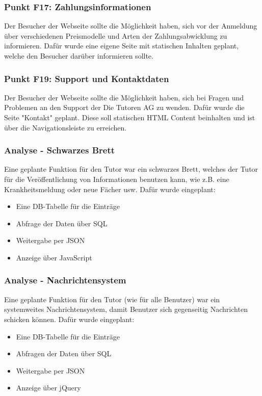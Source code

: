 \begin{frame}
  	\frametitle{Punkt F17: Zahlungsinformationen}
  
  	Der Besucher der Webseite sollte die Möglichkeit haben, sich vor der Anmeldung über verschiedenen Preismodelle und Arten der Zahlungsabwicklung zu informieren.
  	\bigskip\newline Dafür wurde eine eigene Seite mit statischen Inhalten geplant, welche den Besucher darüber informieren sollte.
\end{frame}

\begin{frame}
  	\frametitle{Punkt F19: Support und Kontaktdaten}
  
  	Der Besucher der Webseite sollte die Möglichkeit haben, sich bei Fragen und Problemen an den Support der Die Tutoren AG zu wenden.
  	\bigskip\newline Dafür wurde die Seite "Kontakt" geplant. Diese soll statischen HTML Content beinhalten und ist über die Navigationsleiste zu erreichen.
\end{frame}

\begin{frame}
  	\frametitle{Analyse - Schwarzes Brett}
  
	Eine geplante Funktion für den Tutor war ein schwarzes Brett, welches der Tutor für die Veröffentlichung von Informationen benutzen kann, wie z.B. eine Krankheitsmeldung oder neue Fächer usw. \newline
	Dafür wurde eingeplant:
	\begin{itemize}
		\item Eine DB-Tabelle für die Einträge
		\item Abfrage der Daten über SQL
		\item Weitergabe per JSON
		\item Anzeige über JavaScript
	\end{itemize}
	
\end{frame}

\begin{frame}
 	\frametitle{Analyse - Nachrichtensystem}

	Eine geplante Funktion für den Tutor (wie für alle Benutzer) war ein systemweites Nachrichtensystem, damit Benutzer sich gegenseitig Nachrichten schicken können. \newline
	Dafür wurde eingeplant:
	\begin{itemize}
		\item Eine DB-Tabelle für die Einträge
		\item Abfragen der Daten über SQL
		\item Weitergabe per JSON
		\item Anzeige über jQuery
	\end{itemize}
	
\end{frame}
